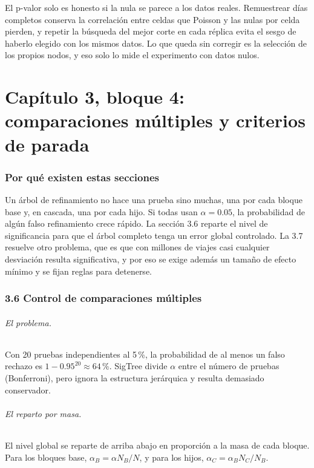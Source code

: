 \documentclass[11pt,a4paper]{article}
\newenvironment{idea}{\par\begin{center}\begin{lrbox}{\ideabox}\begin{minipage}{0.9\linewidth}}{\end{minipage}\end{lrbox}\fcolorbox{blue!40!black}{blue!5}{\usebox{\ideabox}}\end{center}}
\begin{document}
\begin{idea}
El p-valor solo es honesto si la nula se parece a los datos reales. Remuestrear días
completos conserva la correlación entre celdas que Poisson y las nulas por celda
pierden, y repetir la búsqueda del mejor corte en cada réplica evita el sesgo de
haberlo elegido con los mismos datos. Lo que queda sin corregir es la selección de
los propios nodos, y eso solo lo mide el experimento con datos nulos.
\end{idea}

\part{Capítulo 3, bloque 4: comparaciones múltiples y criterios de parada}

\section{Por qué existen estas secciones}

Un árbol de refinamiento no hace una prueba sino muchas, una por cada bloque base y,
en cascada, una por cada hijo. Si todas usan $\alpha=0.05$, la probabilidad de algún
falso refinamiento crece rápido. La sección 3.6 reparte el nivel de significancia
para que el árbol completo tenga un error global controlado. La 3.7 resuelve otro
problema, que es que con millones de viajes casi cualquier desviación resulta
significativa, y por eso se exige además un tamaño de efecto mínimo y se fijan reglas
para detenerse.

\section{3.6 Control de comparaciones múltiples}

\paragraph{El problema.} Con 20 pruebas independientes al 5\,\%, la probabilidad de
al menos un falso rechazo es $1-0.95^{20}\approx64$\,\%. SigTree divide $\alpha$
entre el número de pruebas (Bonferroni), pero ignora la estructura jerárquica y
resulta demasiado conservador.

\paragraph{El reparto por masa.} El nivel global se reparte de arriba abajo en
proporción a la masa de cada bloque. Para los bloques base,
$\alpha_B=\alpha N_B/N$, y para los hijos, $\alpha_C=\alpha_BN_C/N_B$.
\end{document}

